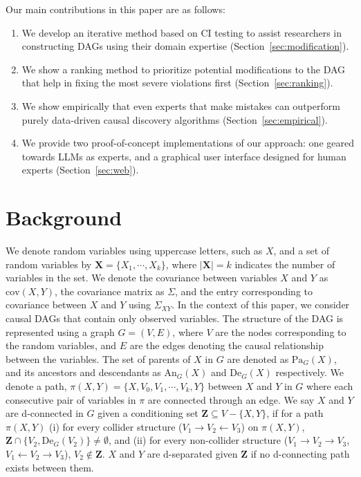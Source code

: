\documentclass{uai2025} %
\begin{document}
Our main contributions in this paper are as follows:

\begin{enumerate}
    \item We develop an iterative method based on CI testing to assist researchers in 
	    constructing DAGs using their domain expertise (Section~\ref{sec:modification}).
    \item We show a ranking method to prioritize potential modifications to the DAG that 
    	    help in fixing the most severe violations first (Section~\ref{sec:ranking}).
    \item We show empirically that even experts that make mistakes can outperform purely data-driven
	causal discovery algorithms (Section~\ref{sec:empirical}).
    \item We provide two proof-of-concept implementations of our approach: one geared towards
	LLMs as experts, and a graphical user interface designed 
	for human experts (Section~\ref{sec:web}).
\end{enumerate}

\section{Background}
\label{sec:background}
We denote random variables using uppercase letters, such as $ X $, and a set of
random variables by $ \bm{X} = \{X_1, \cdots, X_k\} $, where $ \rvert \bm{X}
\rvert = k $ indicates the number of variables in the set. We denote the
covariance between variables $ X $ and $ Y $ as $ \mathrm{cov}(X, Y) $, the
covariance matrix as $ \Sigma $, and the entry corresponding to covariance
between $ X $ and $ Y $ using $ \Sigma_{XY} $. In the context of this paper, we
consider causal DAGs that contain only observed variables. The structure of the
DAG is represented using a graph $ G = (V, E) $, where $ V $ are the nodes
corresponding to the random variables, and $ E $ are the edges denoting the
causal relationship between the variables. The set of parents of $ X $ in $ G $
are denoted as $ \textrm{Pa}_G(X) $, and its ancestors and descendants as $
\textrm{An}_G(X) $ and $ \textrm{De}_G(X) $ respectively. We denote a path, $
\pi(X, Y) = \{ X, V_0, V_1, \cdots, V_k, Y \} $ between $ X $ and $ Y $ in $ G
$ where each consecutive pair of variables in $ \pi $ are connected through an
edge. We say $ X $ and $ Y $ are d-connected in $ G $ given a conditioning set
$ \bm{Z} \subseteq V - \{X, Y\} $, if for a path $ \pi(X, Y) $ (i) for every
collider structure ($ V_1 \rightarrow V_2 \leftarrow V_3 $) on $ \pi(X, Y) $, $
\bm{Z} \cap \{ V_2, \textrm{De}_G(V_2) \} \ne \emptyset $, and (ii) for every
non-collider structure ($ V_1 \rightarrow V_2 \rightarrow V_3 $, $ V_1
\leftarrow V_2 \rightarrow V_3 $), $ V_2 \not \in \bm{Z} $. $ X $ and $ Y $ are
d-separated given $ \bm{Z} $ if no d-connecting path exists between them.
\end{document}
